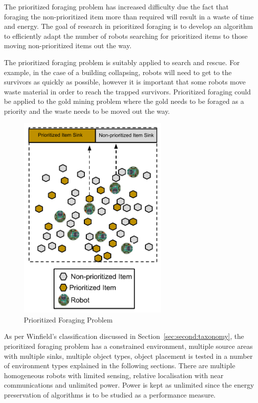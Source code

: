 The prioritized foraging problem has increased difficulty due the fact that  foraging the non-prioritized item more than required will result in a waste of time and energy. The goal of research in prioritized foraging is to develop an algorithm to efficiently adapt the number of robots searching for prioritized items to those moving non-prioritized items out the way. 

The prioritized foraging problem is suitably applied to search and rescue. For example, in the case of a building collapsing, robots will need to get to the survivors as quickly as possible, however it is important that some robots move waste material in order to reach the trapped survivors. Prioritized foraging could be applied to the gold mining problem where the gold needs to be foraged as a priority and the waste needs to be moved out the way.


\begin{figure} [h]
	\centering
	\includegraphics[width=0.65\textwidth]{chapters/chapter2/figures/EpuckGoldMining.pdf}
	\caption{Prioritized Foraging Problem }
	\label{prioritizedforaging}
\end{figure}

As per Winfield's classification discussed in Section~\ref{sec:second:taxonomy}, the prioritized foraging problem has a constrained environment, multiple source areas with multiple sinks, multiple object types, object placement is tested in a number of environment types explained in the following sections. There are multiple homogeneous robots with limited sensing, relative localisation with near communications and unlimited power. Power is kept as unlimited since the energy preservation of algorithms is to be studied as a performance measure. 


